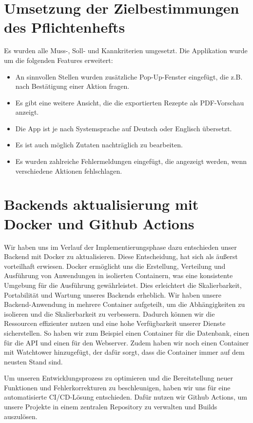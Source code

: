 \documentclass{implementierungsheft}
\begin{document}
\section{Umsetzung der Zielbestimmungen des Pflichtenhefts} \label{sec:changes}
Es wurden alle Muss-, Soll- und Kannkriterien umgesetzt. Die Applikation wurde um die folgenden Features erweitert:
\begin{itemize}
    \item An sinnvollen Stellen wurden zusätzliche Pop-Up-Fenster eingefügt, die z.B. nach Bestätigung einer Aktion fragen.
    \item Es gibt eine weitere Ansicht, die die exportierten Rezepte als PDF-Vorschau anzeigt.
    \item Die App ist je nach Systemsprache auf Deutsch oder Englisch übersetzt.
    \item Es ist auch möglich Zutaten nachträglich zu bearbeiten.
    \item Es wurden zahlreiche Fehlermeldungen eingefügt, die angezeigt werden, wenn verschiedene Aktionen fehlschlagen.
\end{itemize}

\section{Backends aktualisierung mit Docker und Github Actions}
Wir haben uns im Verlauf der Implementierungsphase dazu entschieden unser Backend mit Docker zu aktualisieren.
Diese Entscheidung, hat sich als äußerst vorteilhaft erwiesen. Docker ermöglicht uns die Erstellung, Verteilung und Ausführung von Anwendungen in isolierten Containern, was eine konsistente Umgebung für die Ausführung gewährleistet. Dies erleichtert die Skalierbarkeit, Portabilität und Wartung unseres Backends erheblich.
Wir haben unsere Backend-Anwendung in mehrere Container aufgeteilt, um die Abhängigkeiten zu isolieren und die Skalierbarkeit zu verbessern. Dadurch können wir die Ressourcen effizienter nutzen und eine hohe Verfügbarkeit unserer Dienste sicherstellen.
So haben wir zum Beispiel einen Container für die Datenbank, einen für die API und einen für den Webserver.
Zudem haben wir noch einen Container mit Watchtower hinzugefügt, der dafür sorgt, dass die Container immer auf dem neusten Stand sind.

Um unseren Entwicklungsprozess zu optimieren und die Bereitstellung neuer Funktionen und Fehlerkorrekturen zu beschleunigen, haben wir uns für eine automatisierte CI/CD-Lösung entschieden. Dafür nutzen wir Github Actions, um unsere Projekte in einem zentralen Repository zu verwalten und Builds auszulösen.
\end{document}
